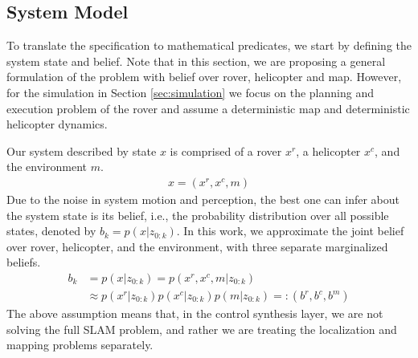\documentclass[conference]{IEEEtran}
\begin{document}
	
	\subsection{System Model}\label{sec:SysModel}
    To translate the specification to mathematical predicates, we start by defining the system state and belief. Note that in this section, we are proposing a general formulation of the problem with belief over rover, helicopter and map. However, for the simulation in Section \ref{sec:simulation} we focus on the planning and execution problem of the rover and assume a deterministic map and deterministic helicopter dynamics.
    
    Our system described by state $x$ is comprised of a rover $x^r$, a helicopter $x^c$, and the environment $m$.
    \begin{align}
        x = (x^r, x^c, m) 
    \end{align}
    Due to the noise in system motion and perception, the best one can infer about the system state is its belief, i.e., the probability distribution over all possible states, denoted by $b_k=p(x|z_{0:k})$. In this work, we approximate the joint belief over rover, helicopter, and the environment, with three separate marginalized beliefs.
    \begin{align}
        \nonumber
        b_k &= p(x|z_{0:k})=p(x^r, x^c, m|z_{0:k})\\
        &\approx p(x^r|z_{0:k})p(x^c|z_{0:k})p(m|z_{0:k})=:(b^r, b^c, b^m)
    \end{align}
    The above assumption means that, in the control synthesis layer, we are not solving the full SLAM problem, and rather we are treating the localization and mapping problems separately. %
    
\end{document}
